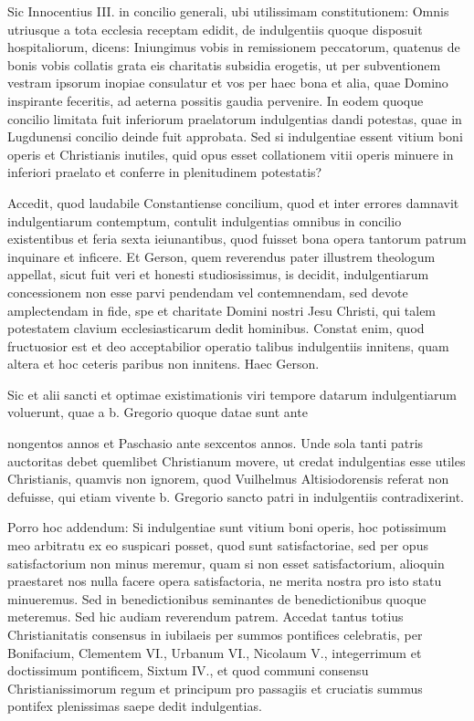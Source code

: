 Sic Innocentius III. in concilio generali, ubi utilissimam constitutionem: Omnis utriusque a tota ecclesia receptam edidit, de indulgentiis quoque disposuit hospitaliorum, dicens: Iniungimus vobis in remissionem peccatorum, quatenus de bonis vobis collatis grata eis charitatis subsidia erogetis, ut per subventionem vestram ipsorum inopiae consulatur et vos per haec bona et alia, quae Domino inspirante feceritis, ad aeterna possitis gaudia pervenire. In eodem quoque concilio limitata fuit inferiorum praelatorum indulgentias dandi potestas, quae in Lugdunensi concilio deinde fuit approbata. Sed si indulgentiae essent vitium boni operis et Christianis inutiles, quid opus esset collationem vitii operis minuere in inferiori praelato et conferre in plenitudinem potestatis?

Accedit, quod laudabile Constantiense concilium, quod et inter errores damnavit indulgentiarum contemptum, contulit indulgentias omnibus in concilio existentibus et feria sexta ieiunantibus, quod fuisset bona opera tantorum patrum inquinare et inficere. Et Gerson, quem reverendus pater illustrem theologum appellat, sicut fuit veri et honesti studiosissimus, is decidit, indulgentiarum concessionem non esse parvi pendendam vel contemnendam, sed devote amplectendam in fide, spe et charitate Domini nostri Jesu Christi, qui talem potestatem clavium ecclesiasticarum dedit hominibus. Constat enim, quod fructuosior est et deo acceptabilior operatio talibus indulgentiis innitens, quam altera et hoc ceteris paribus non innitens. Haec Gerson.

Sic et alii sancti et optimae existimationis viri tempore datarum indulgentiarum voluerunt, quae a b. Gregorio quoque datae sunt ante

nongentos annos et Paschasio ante sexcentos annos. Unde sola tanti patris auctoritas debet quemlibet Christianum movere, ut credat indulgentias esse utiles Christianis, quamvis non ignorem, quod Vuilhelmus Altisiodorensis referat non defuisse, qui etiam vivente b. Gregorio sancto patri in indulgentiis contradixerint.

Porro hoc addendum: Si indulgentiae sunt vitium boni operis, hoc potissimum meo arbitratu ex eo suspicari posset, quod sunt satisfactoriae, sed \marginpar{\small[346]} per opus satisfactorium non minus meremur, quam si non esset satisfactorium, alioquin praestaret nos nulla facere opera satisfactoria, ne merita nostra pro isto statu minueremus. Sed in benedictionibus seminantes de benedictionibus quoque meteremus. Sed hic audiam reverendum patrem. Accedat tantus totius Christianitatis consensus in iubilaeis per summos pontifices celebratis, per Bonifacium, Clementem VI., Urbanum VI., Nicolaum V., integerrimum et doctissimum pontificem, Sixtum IV., et quod communi consensu Christianissimorum regum et principum pro passagiis et cruciatis summus pontifex plenissimas saepe dedit indulgentias.

